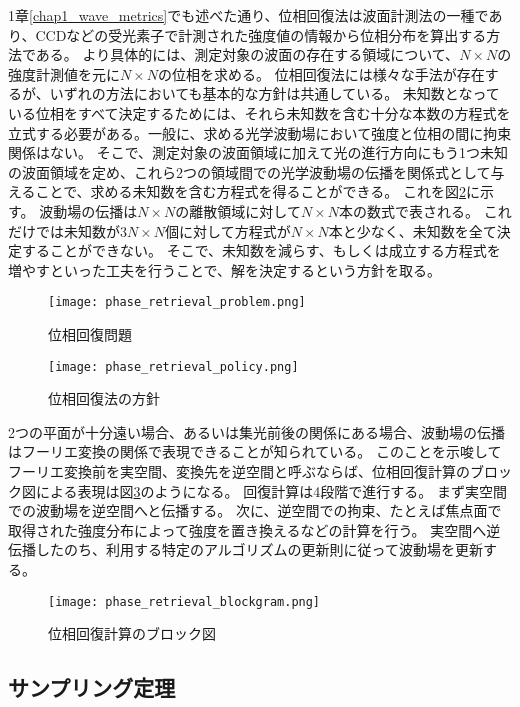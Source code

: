 1章\ref{chap1_wave_metrics}でも述べた通り、位相回復法は波面計測法の一種であり、CCDなどの受光素子で計測された強度値の情報から位相分布を算出する方法である。
より具体的には、測定対象の波面の存在する領域について、$N \times N$の強度計測値を元に$N \times N$の位相を求める。
位相回復法には様々な手法が存在するが、いずれの方法においても基本的な方針は共通している。
未知数となっている位相をすべて決定するためには、それら未知数を含む十分な本数の方程式を立式する必要がある。一般に、求める光学波動場において強度と位相の間に拘束関係はない。
そこで、測定対象の波面領域に加えて光の進行方向にもう1つ未知の波面領域を定め、これら2つの領域間での光学波動場の伝播を関係式として与えることで、求める未知数を含む方程式を得ることができる。
これを図\ref{fig:phase_retrieval_policy}に示す。
波動場の伝播は$N \times N$の離散領域に対して$N \times N$本の数式で表される。
これだけでは未知数が$3N \times N$個に対して方程式が$N \times N$本と少なく、未知数を全て決定することができない。
そこで、未知数を減らす、もしくは成立する方程式を増やすといった工夫を行うことで、解を決定するという方針を取る。

\begin{figure}[!ht]
\centering
\texttt{[image: phase\_retrieval\_problem.png]}
\caption{位相回復問題}
\label{fig:phase_retrieval_problem}
\end{figure}

\begin{figure}[!ht]
\centering
\texttt{[image: phase\_retrieval\_policy.png]}
\caption{位相回復法の方針}
\label{fig:phase_retrieval_policy}
\end{figure}

2つの平面が十分遠い場合、あるいは集光前後の関係にある場合、波動場の伝播はフーリエ変換の関係で表現できることが知られている。
このことを示唆してフーリエ変換前を実空間、変換先を逆空間と呼ぶならば、位相回復計算のブロック図による表現は図\ref{fig:phase_retrieval_blockgram}のようになる。
回復計算は4段階で進行する。
まず実空間での波動場を逆空間へと伝播する。
次に、逆空間での拘束、たとえば焦点面で取得された強度分布によって強度を置き換えるなどの計算を行う。
実空間へ逆伝播したのち、利用する特定のアルゴリズムの更新則に従って波動場を更新する。

\begin{figure}[!ht]
\centering
\texttt{[image: phase\_retrieval\_blockgram.png]}
\caption{位相回復計算のブロック図}
\label{fig:phase_retrieval_blockgram}
\end{figure}


\subsection{サンプリング定理}
\label{chap3_sampling_theorem}

